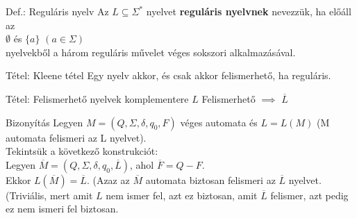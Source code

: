 \documentclass{beamer}
\begin{document}
\begin{frame}

\begin{block}{Def.: Reguláris nyelv}
Az $L \subseteq {\Sigma}^*$ nyelvet \textbf{reguláris nyelvnek} nevezzük, ha előáll az\\
$\emptyset$ és $\{a\}$ $(a \in {\Sigma})$\\
nyelvekből a három reguláris művelet véges sokszori alkalmazásával.
\end{block}

\begin{block}{Tétel: Kleene tétel}
Egy nyelv akkor, és csak akkor felismerhető, ha reguláris.
\end{block}

\end{frame}

\begin{frame}
\begin{block}{Tétel: Felismerhető nyelvek komplementere}
$L$ Felismerhető $\implies$ $\overline{L}$

\end{block}

\begin{block}{Bizonyítás}
Legyen $M = (Q, \Sigma , \delta , q_0, F)$ véges automata és $L = L(M)$ (M automata felismeri az L nyelvet).\\
Tekintsük a következő konstrukciót:\\
Legyen $\overline{M} = (Q, \Sigma , \delta, q_0, \overline{L})$, ahol $\overline{F} = Q - F$.\\
Ekkor  $L(\overline{M}) = \overline{L}$. (Azaz az $\overline{M}$ automata biztosan felismeri az $\overline{L}$ nyelvet.\\ 
(Triviális, mert amit $L$ nem ismer fel, azt ez biztosan, amit $\overline{L}$ felismer, azt pedig ez nem ismeri fel biztosan.

\end{block}

\end{frame}
\end{document}
